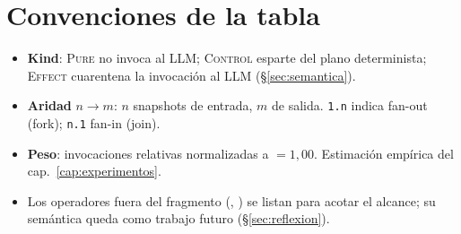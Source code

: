 \section{Convenciones de la tabla}

\begin{itemize}
\item \textbf{Kind}: \textsc{Pure} no invoca al LLM; \textsc{Control} esparte
  del plano determinista; \textsc{Effect} cuarentena la invocación al LLM
  (\S\ref{sec:semantica}).
\item \textbf{Aridad} $n{\to}m$: $n$ snapshots de entrada, $m$ de salida.
  \texttt{1.n} indica fan-out (fork); \texttt{n.1} fan-in (join).
\item \textbf{Peso}: invocaciones relativas normalizadas a
  $=1{,}00$. Estimación empírica del cap.~\ref{cap:experimentos}.
\item Los operadores fuera del fragmento (, ) se
  listan para acotar el alcance; su semántica queda como trabajo futuro
  (\S\ref{sec:reflexion}).
\end{itemize}
